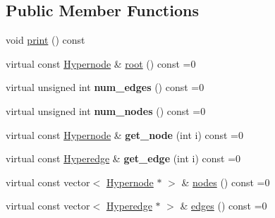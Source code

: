 \subsection*{Public Member Functions}
\begin{DoxyCompactItemize}
\item 
void \hyperlink{classScarab_1_1HG_1_1Hypergraph_a8976308c04be0b66d541e7c431550e9c}{print} () const 
\item 
virtual const \hyperlink{classScarab_1_1HG_1_1Hypernode}{Hypernode} \& \hyperlink{classScarab_1_1HG_1_1Hypergraph_ad8db2ab9208202af5c9ce9739c670c56}{root} () const =0
\item 
\hypertarget{classScarab_1_1HG_1_1Hypergraph_a84b613321bf36995a401ac4e0883a355}{
virtual unsigned int {\bfseries num\_\-edges} () const =0}
\label{classScarab_1_1HG_1_1Hypergraph_a84b613321bf36995a401ac4e0883a355}

\item 
\hypertarget{classScarab_1_1HG_1_1Hypergraph_a9cb768d463207c3db348cfd74a09ade3}{
virtual unsigned int {\bfseries num\_\-nodes} () const =0}
\label{classScarab_1_1HG_1_1Hypergraph_a9cb768d463207c3db348cfd74a09ade3}

\item 
\hypertarget{classScarab_1_1HG_1_1Hypergraph_a8cc34c61d7ca3994adfe69951dab7e31}{
virtual const \hyperlink{classScarab_1_1HG_1_1Hypernode}{Hypernode} \& {\bfseries get\_\-node} (int i) const =0}
\label{classScarab_1_1HG_1_1Hypergraph_a8cc34c61d7ca3994adfe69951dab7e31}

\item 
\hypertarget{classScarab_1_1HG_1_1Hypergraph_a4d4fe463a633174b7a2a3e415a9c551b}{
virtual const \hyperlink{classScarab_1_1HG_1_1Hyperedge}{Hyperedge} \& {\bfseries get\_\-edge} (int i) const =0}
\label{classScarab_1_1HG_1_1Hypergraph_a4d4fe463a633174b7a2a3e415a9c551b}

\item 
virtual const vector$<$ \hyperlink{classScarab_1_1HG_1_1Hypernode}{Hypernode} $\ast$ $>$ \& \hyperlink{classScarab_1_1HG_1_1Hypergraph_a9fc9b640b1b05bf3ce78a3bd941266ce}{nodes} () const =0
\item 
virtual const vector$<$ \hyperlink{classScarab_1_1HG_1_1Hyperedge}{Hyperedge} $\ast$ $>$ \& \hyperlink{classScarab_1_1HG_1_1Hypergraph_ac4f2f32e618d60d94a918a7bb1063666}{edges} () const =0
\end{DoxyCompactItemize}


